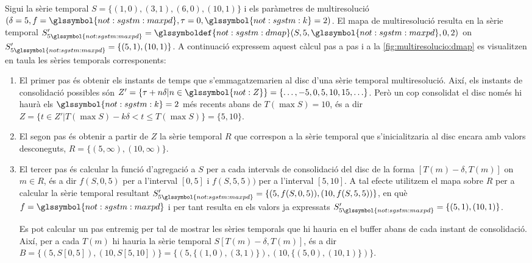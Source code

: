\begin{example}
  \label{ex:multiresolucio:dmap}
  Sigui la sèrie temporal $S=\{(1,0),(3,1),(6,0),(10,1)\}$ i els
  paràmetres de multiresolució
  $(\delta=5,f=\glssymbol{not:sgstm:maxpd},\tau=0,\glssymbol{not:sgstm:k}=2)$.
  El mapa de multiresolució resulta en la sèrie temporal
  $S_{5\glssymbol{not:sgstm:maxpd}}'=
  \glssymboldef{not:sgstm:dmap}(S,5,\glssymbol{not:sgstm:maxpd},0,2)$
  on $S'_{5\glssymbol{not:sgstm:maxpd}}=\{(5,1),(10,1)\}$. A
  continuació expressem aquest càlcul pas a pas i a la
  \autoref{fig:multiresolucio:dmap} es visualitzen en taula les sèries
  temporals corresponents:
  \begin{enumerate}
  \item El primer pas és obtenir els instants de temps que
    s'emmagatzemarien al disc d'una sèrie temporal
    multiresolució. Així, els instants de consolidació possibles són
    $Z'=\{\tau+n\delta|n\in\glssymbol{not:Z}\}=
    \{\ldots,-5,0,5,10,15,\ldots\}$. Però un cop consolidat el disc
    només hi haurà els $\glssymbol{not:sgstm:k}=2$ més recents abans
    de $T(\max S)=10$, és a dir $Z=\{t\in Z'| T(\max S) - k\delta
    < t \leq T(\max S)\}=\{5,10\}$.

  \item El segon pas és obtenir a partir de $Z$ la sèrie temporal
    $R$ que correspon a la sèrie temporal que s'inicialitzaria
    al disc encara amb valors desconeguts,
    $R=\{(5,\infty),(10,\infty)\}$.



  \item El tercer pas és calcular la funció d'agregació a $S$ per a
    cada intervals de consolidació del disc de la forma
    $[T(m)-\delta,T(m)]$ on $m\in R$, és a dir $f(S,0,5)$ per a
    l'interval $[0,5]$ i $f(S,5,5))$ per a l'interval $[5,10]$. A tal
    efecte utilitzem el mapa sobre $R$ per a calcular la sèrie
    temporal resultant $S'_{5\glssymbol{not:sgstm:maxpd}}=\{
    (5,f(S,0,5)), (10,f(S,5,5)) \}$, en què
    $f=\glssymbol{not:sgstm:maxpd}$ i per tant resulta en els valors
    ja expressats
    $S'_{5\glssymbol{not:sgstm:maxpd}}=\{(5,1),(10,1)\}$.

    Es pot calcular un pas entremig per tal de mostrar les sèries
    temporals que hi hauria en el buffer abans de cada instant de
    consolidació. Així, per a cada $T(m)$ hi hauria la sèrie
    temporal $S[T(m)-\delta,T(m)]$, és a dir $B=\{
    (5,S[0,5]),(10,S[5,10]) \}=\{ (5,\{(1,0),(3,1)\}),
    (10,\{(5,0),(10,1)\})\}$.
  \end{enumerate}




\end{example}
